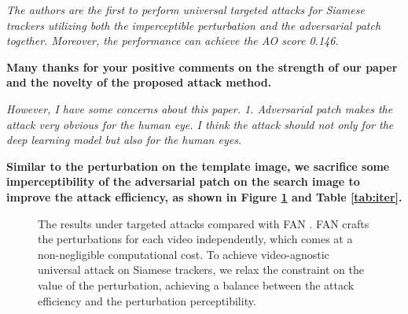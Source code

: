 \documentclass[12pt]{article}
\begin{document}
\newpage
\textit{The authors are the first to perform universal targeted attacks for Siamese trackers utilizing both the imperceptible perturbation and the adversarial patch together. Moreover, the performance can achieve the AO score 0.146.}

\textbf{Many thanks for your positive comments on the strength of our paper and the novelty of the proposed attack method.}

\textit{However, I have some concerns about this paper. 1. Adversarial patch makes the attack very obvious for the human eye. I think the attack should not only for the deep learning model but also for the human eyes.}

\textbf{
Similar to the perturbation on the template image, we sacrifice some imperceptibility of the adversarial patch on the search image to improve the attack efficiency, as shown in Figure \ref{fig:vis} and Table \ref{tab:iter}.}

\begin{figure}[h]
    \centering
    \caption{The results under targeted attacks compared with FAN \cite{FAN}.  FAN crafts the perturbations for each video independently, which comes at a non-negligible computational cost. To achieve video-agnostic universal attack on Siamese trackers, we relax the constraint on the value of the perturbation, achieving a balance between the attack efficiency and the perturbation perceptibility.}
    \label{fig:vis}
\end{figure}
\end{document}
